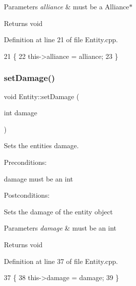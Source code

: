 \begin{DoxyParams}{Parameters}
{\em alliance} & must be a Alliance$\ast$ \\
\hline
\end{DoxyParams}
\begin{DoxyReturn}{Returns}
void 
\end{DoxyReturn}


Definition at line 21 of file Entity.\+cpp.


\begin{DoxyCode}
21                                            \{
22     this->alliance = alliance;
23 \}
\end{DoxyCode}
\mbox{\label{classEntity_aae05f62767eb7438c846300704f9579b}} 
\subsubsection{\texorpdfstring{set\+Damage()}{setDamage()}}
{\footnotesize\ttfamily void Entity\+::set\+Damage (\begin{DoxyParamCaption}\item[{int}]{damage }\end{DoxyParamCaption})}



Sets the entities damage. 

Preconditions\+:
\begin{DoxyItemize}
\item damage must be an int
\end{DoxyItemize}

Postconditions\+:
\begin{DoxyItemize}
\item Sets the damage of the entity object
\end{DoxyItemize}


\begin{DoxyParams}{Parameters}
{\em damage} & must be an int \\
\hline
\end{DoxyParams}
\begin{DoxyReturn}{Returns}
void 
\end{DoxyReturn}


Definition at line 37 of file Entity.\+cpp.


\begin{DoxyCode}
37                                  \{
38     this->damage = damage;
39 \}
\end{DoxyCode}
\mbox{\label{classEntity_a7dae281ff92be9bc98672cafe05c77ab}} 
